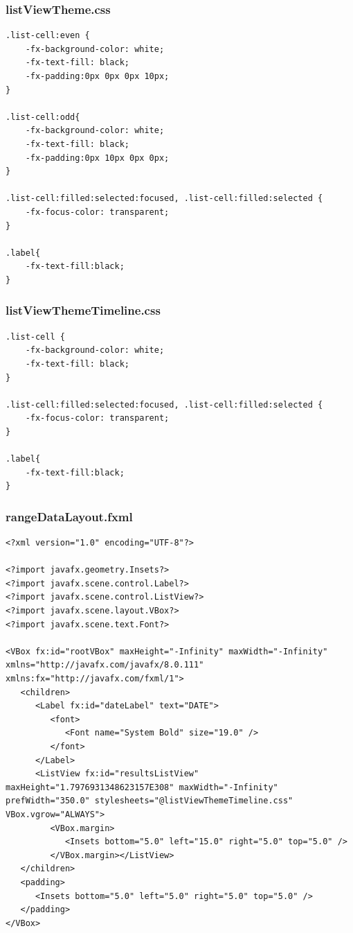\subsubsection{listViewTheme.css}
\begin{lstlisting}
.list-cell:even {
    -fx-background-color: white;
    -fx-text-fill: black;
    -fx-padding:0px 0px 0px 10px;
}

.list-cell:odd{
    -fx-background-color: white;
    -fx-text-fill: black;
    -fx-padding:0px 10px 0px 0px;
}

.list-cell:filled:selected:focused, .list-cell:filled:selected {
    -fx-focus-color: transparent;
}

.label{
    -fx-text-fill:black;
}
\end{lstlisting}
\subsubsection{listViewThemeTimeline.css}
\begin{lstlisting}
.list-cell {
    -fx-background-color: white;
    -fx-text-fill: black;
}

.list-cell:filled:selected:focused, .list-cell:filled:selected {
    -fx-focus-color: transparent;
}

.label{
    -fx-text-fill:black;
}
\end{lstlisting}
\subsubsection{rangeDataLayout.fxml}
\begin{lstlisting}
<?xml version="1.0" encoding="UTF-8"?>

<?import javafx.geometry.Insets?>
<?import javafx.scene.control.Label?>
<?import javafx.scene.control.ListView?>
<?import javafx.scene.layout.VBox?>
<?import javafx.scene.text.Font?>

<VBox fx:id="rootVBox" maxHeight="-Infinity" maxWidth="-Infinity" xmlns="http://javafx.com/javafx/8.0.111" xmlns:fx="http://javafx.com/fxml/1">
   <children>
      <Label fx:id="dateLabel" text="DATE">
         <font>
            <Font name="System Bold" size="19.0" />
         </font>
      </Label>
      <ListView fx:id="resultsListView" maxHeight="1.7976931348623157E308" maxWidth="-Infinity" prefWidth="350.0" stylesheets="@listViewThemeTimeline.css" VBox.vgrow="ALWAYS">
         <VBox.margin>
            <Insets bottom="5.0" left="15.0" right="5.0" top="5.0" />
         </VBox.margin></ListView>
   </children>
   <padding>
      <Insets bottom="5.0" left="5.0" right="5.0" top="5.0" />
   </padding>
</VBox>
\end{lstlisting}

